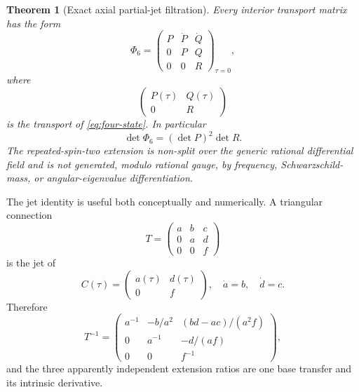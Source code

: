 \documentclass[11pt]{article}
\newtheorem{theorem}{Theorem}[section]
\theoremstyle{definition}
\theoremstyle{remark}
\begin{document}
\begin{theorem}[Exact axial partial-jet filtration]
\label{thm:jet}
Every interior transport matrix has the form
\begin{equation}
\label{eq:jet-transport}
\Phi_6=
\begin{pmatrix}
P&\dot P&\dot Q\\
0&P&Q\\
0&0&R
\end{pmatrix}_{\tau=0},
\end{equation}
where
\[
\begin{pmatrix}P(\tau)&Q(\tau)\\0&R\end{pmatrix}
\]
is the transport of \eqref{eq:four-state}.  In particular
\[
\det\Phi_6=(\det P)^2\det R.
\]
The repeated-spin-two extension is non-split over the generic rational
differential field and is not generated, modulo rational gauge, by frequency,
Schwarzschild-mass, or angular-eigenvalue differentiation.
\end{theorem}

The jet identity is useful both conceptually and numerically.  A triangular
connection
\[
T=
\begin{pmatrix}
a&b&c\\0&a&d\\0&0&f
\end{pmatrix}
\]
is the jet of
\[
C(\tau)=\begin{pmatrix}a(\tau)&d(\tau)\\0&f\end{pmatrix},
\quad
\dot a=b,\quad \dot d=c.
\]
Therefore
\begin{equation}
\label{eq:inverse-ratios}
T^{-1}=
\begin{pmatrix}
a^{-1}&-b/a^2&(bd-ac)/(a^2f)\\
0&a^{-1}&-d/(af)\\
0&0&f^{-1}
\end{pmatrix},
\end{equation}
and the three apparently independent extension ratios are one base transfer
and its intrinsic derivative.
\end{document}
